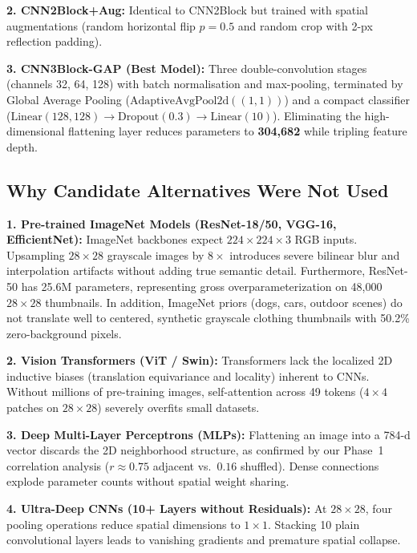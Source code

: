\documentclass[conference]{IEEEtran}
\begin{document}
\textbf{2. CNN2Block+Aug:} Identical to CNN2Block but trained with spatial augmentations (random horizontal flip $p=0.5$ and random crop with 2-px reflection padding).

\textbf{3. CNN3Block-GAP (Best Model):} Three double-convolution stages (channels 32, 64, 128) with batch normalisation and max-pooling, terminated by Global Average Pooling ($\mathrm{AdaptiveAvgPool2d}((1, 1))$) and a compact classifier ($\mathrm{Linear}(128, 128) \to \mathrm{Dropout}(0.3) \to \mathrm{Linear}(10)$). Eliminating the high-dimensional flattening layer reduces parameters to \textbf{304{,}682} while tripling feature depth.

\subsection{Why Candidate Alternatives Were Not Used}
\textbf{1. Pre-trained ImageNet Models (ResNet-18/50, VGG-16, EfficientNet):}
ImageNet backbones expect $224\times224\times3$ RGB inputs. Upsampling $28\times28$ grayscale images by $8\times$ introduces severe bilinear blur and interpolation artifacts without adding true semantic detail. Furthermore, ResNet-50 has 25.6M parameters, representing gross overparameterization on 48,000 $28\times28$ thumbnails. In addition, ImageNet priors (dogs, cars, outdoor scenes) do not translate well to centered, synthetic grayscale clothing thumbnails with 50.2\% zero-background pixels.

\textbf{2. Vision Transformers (ViT / Swin):}
Transformers lack the localized 2D inductive biases (translation equivariance and locality) inherent to CNNs. Without millions of pre-training images, self-attention across 49 tokens ($4\times4$ patches on $28\times28$) severely overfits small datasets.

\textbf{3. Deep Multi-Layer Perceptrons (MLPs):}
Flattening an image into a 784-d vector discards the 2D neighborhood structure, as confirmed by our Phase~1 correlation analysis ($r\approx0.75$ adjacent vs.\ $0.16$ shuffled). Dense connections explode parameter counts without spatial weight sharing.

\textbf{4. Ultra-Deep CNNs (10+ Layers without Residuals):}
At $28\times28$, four pooling operations reduce spatial dimensions to $1\times1$. Stacking 10 plain convolutional layers leads to vanishing gradients and premature spatial collapse.
\end{document}
